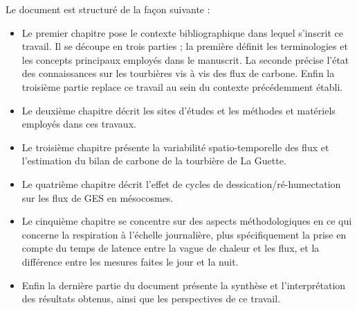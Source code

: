 Le document est structuré de la façon suivante :
\begin{itemize}
\item Le premier chapitre pose le contexte bibliographique dans lequel s'inscrit ce travail.
Il se découpe en trois parties ; la première définit les terminologies et les concepts principaux employés dans le manuscrit.
La seconde précise l'état des connaissances sur les tourbières vis à vis des flux de carbone.
Enfin la troisième partie replace ce travail au sein du contexte précédemment établi.
\item Le deuxième chapitre décrit les sites d'études et les méthodes et matériels employés dans ces travaux.
\item Le troisième chapitre présente la variabilité spatio-temporelle des flux et l'estimation du bilan de carbone de la tourbière de La Guette.
\item Le quatrième chapitre décrit l'effet de cycles de dessication/ré-humectation sur les flux de GES en mésocosmes.
\item Le cinquième chapitre se concentre sur des aspects méthodologiques en ce qui concerne la respiration à l'échelle journalière, plus spécifiquement la prise en compte du temps de latence entre la vague de chaleur et les flux, et la différence entre les mesures faites le jour et la nuit.
\item Enfin la dernière partie du document présente la synthèse et l'interprétation des résultats obtenus, ainsi que les perspectives de ce travail.
\end{itemize}

%

